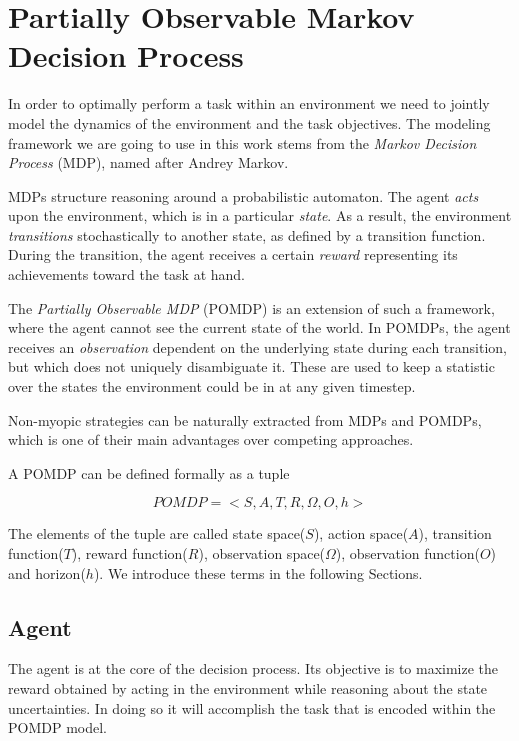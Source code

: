 \section{Partially Observable Markov Decision Process}\label{ref:pomdp}

In order to optimally perform a task within an environment we need to jointly model the dynamics of
the environment and the task objectives. The modeling framework we are going to use in this work
stems from the \textit{Markov Decision Process} (MDP), named after Andrey Markov.

MDPs structure reasoning around a probabilistic automaton. The agent \textit{acts} upon the
environment, which is in a particular \textit{state}. As a result, the environment
\textit{transitions} stochastically to another state, as defined by a transition function. During
the transition, the agent receives a certain \textit{reward} representing its achievements
toward the task at hand.

The \textit{Partially Observable MDP} (POMDP) is an extension of such a framework, where the agent
cannot see the current state of the world. In POMDPs, the agent receives an \textit{observation}
dependent on the underlying state during each transition, but which does not uniquely disambiguate
it. These are used to keep a statistic over the states the environment could be in at any given
timestep.

Non-myopic strategies can be naturally extracted from MDPs and POMDPs, which is one of their main
advantages over competing approaches.

A POMDP can be defined formally as a tuple

\[ POMDP = <S,A,T,R,\Omega,O,h> \]

The elements of the tuple are called state space($S$), action space($A$), transition function($T$),
reward function($R$), observation space($\Omega$), observation function($O$) and horizon($h$). We
introduce these terms in the following Sections.

\subsection{Agent}

The agent is at the core of the decision process. Its objective is to maximize the reward obtained
by acting in the environment while reasoning about the state uncertainties. In doing so it will
accomplish the task that is encoded within the POMDP model.

